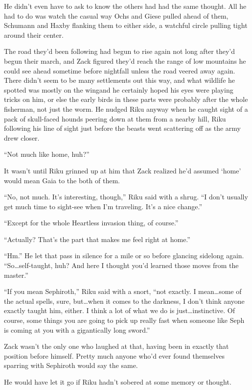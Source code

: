 He didn't even have to ask to know the others had had the same thought. All he had to do was watch the casual way Ochs and Giese pulled ahead of them, Schumann and Haxby flanking them to either side, a watchful circle pulling tight around their center.

The road they'd been following had begun to rise again not long after they'd begun their march, and Zack figured they'd reach the range of low mountains he could see ahead sometime before nightfall unless the road veered away again. There didn't seem to be many settlements out this way, and what wildlife he spotted was mostly on the wing\textemdash and he certainly hoped his eyes were playing tricks on him, or else the early birds in these parts were probably after the whole fisherman, not just the worm. He nudged Riku anyway when he caught sight of a pack of skull-faced hounds peering down at them from a nearby hill, Riku following his line of sight just before the beasts went scattering off as the army drew closer.

``Not much like home, huh?''

It wasn't until Riku grinned up at him that Zack realized he'd assumed `home' would mean Gaia to the both of them.

``No, not much. It's interesting, though,'' Riku said with a shrug. ``I don't usually get much time to sight-see when I'm traveling. It's a nice change.''

``Except for the whole Heartless invasion thing, of course.''

``Actually? That's the part that makes me feel right at home.''

``Hm.'' He let that pass in silence for a mile or so before glancing sidelong again. ``So\ldots self-taught, huh? And here I thought you'd learned those moves from the master.''

``If you mean Sephiroth,'' Riku said with a snort, ``not exactly. I mean\ldots some of the actual spells, sure, but\ldots when it comes to the darkness, I don't think anyone exactly taught him, either. I think a lot of what we do is just\ldots instinctive. Of course, some things you are going to pick up really fast when someone like Seph is coming at you with a gigantically long sword.''

Zack wasn't the only one who laughed at that, having been in exactly that position before himself. Pretty much anyone who'd ever found themselves sparring with Sephiroth would say the same.

He would have let it go if Riku hadn't sobered at some memory or thought.

